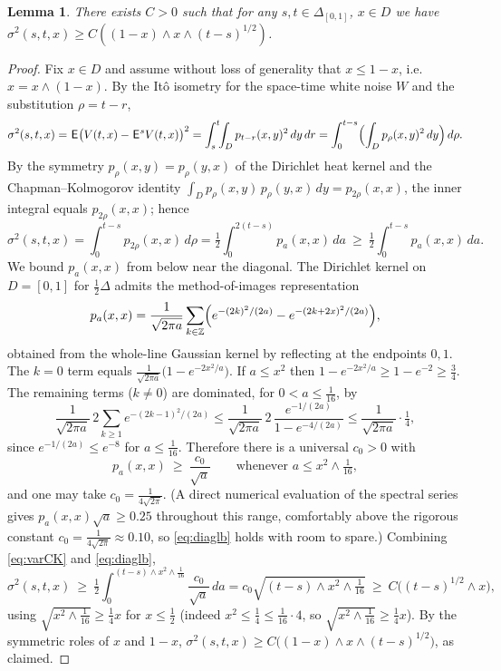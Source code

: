 \documentclass[12pt]{article}
\newtheorem{lemma}[theorem]{Lemma}
\theoremstyle{definition}
\DeclareMathOperator{\1}{\mathbbm{1}}%
\def\E{\hskip.15ex\mathsf{E}\hskip.10ex}
\renewcommand{\ge}{\geqslant}
\renewcommand{\le}{\leqslant}
\newcommand{\Z}{\mathbb{Z}}
\begin{document}
\begin{lemma}\label{L:fkb} There exists $C>0$ such that for any $s,t\in\Delta_{[0,1]}$, $x\in D$ we have 
$\sigma^2(s,t,x)\ge  C ((1-x)\wedge x \wedge (t-s)^{1/2})$.
\end{lemma}


\begin{proof}
Fix $x\in D$ and assume without loss of generality that $x\le 1-x$, i.e. $x=x\wedge(1-x)$.
By the It\^o isometry for the space-time white noise $W$ and the substitution $\rho=t-r$,
\begin{equation}\label{eq:varform}
\sigma^2(s,t,x)=\E\bigl(V(t,x)-\E^sV(t,x)\bigr)^2
=\int_s^t\!\!\int_D p_{t-r}(x,y)^2\,dy\,dr
=\int_0^{t-s}\Bigl(\int_D p_\rho(x,y)^2\,dy\Bigr)\,d\rho .
\end{equation}
By the symmetry $p_\rho(x,y)=p_\rho(y,x)$ of the Dirichlet heat kernel and the
Chapman--Kolmogorov identity $\int_D p_\rho(x,y)\,p_\rho(y,x)\,dy=p_{2\rho}(x,x)$,
the inner integral equals $p_{2\rho}(x,x)$; hence
\begin{equation}\label{eq:varCK}
\sigma^2(s,t,x)=\int_0^{t-s}p_{2\rho}(x,x)\,d\rho
=\tfrac12\int_0^{2(t-s)}p_a(x,x)\,da
\ \ge\ \tfrac12\int_0^{t-s}p_a(x,x)\,da .
\end{equation}
We bound $p_a(x,x)$ from below near the diagonal. The Dirichlet kernel on $D=[0,1]$ for
$\tfrac12\Delta$ admits the method-of-images representation
\[
p_a(x,x)=\frac1{\sqrt{2\pi a}}\sum_{k\in\Z}\Bigl(e^{-(2k)^2/(2a)}-e^{-(2k+2x)^2/(2a)}\Bigr),
\]
obtained from the whole-line Gaussian kernel by reflecting at the endpoints $0,1$. The
$k=0$ term equals $\frac1{\sqrt{2\pi a}}\bigl(1-e^{-2x^2/a}\bigr)$. If $a\le x^2$ then
$1-e^{-2x^2/a}\ge 1-e^{-2}\ge\tfrac34$. The remaining terms ($k\ne0$) are dominated, for
$0<a\le\frac1{16}$, by
\[
\frac1{\sqrt{2\pi a}}\,2\sum_{k\ge1}e^{-(2k-1)^2/(2a)}
\le \frac1{\sqrt{2\pi a}}\,2\,\frac{e^{-1/(2a)}}{1-e^{-4/(2a)}}\le \frac1{\sqrt{2\pi a}}\cdot\tfrac14,
\]
since $e^{-1/(2a)}\le e^{-8}$ for $a\le\frac1{16}$. Therefore there is a universal $c_0>0$ with
\begin{equation}\label{eq:diaglb}
p_a(x,x)\ \ge\ \frac{c_0}{\sqrt a}\qquad\text{whenever } a\le x^2\wedge\tfrac1{16},
\end{equation}
and one may take $c_0=\tfrac{1}{4\sqrt{2\pi}}$. (A direct numerical evaluation of the
spectral series gives $p_a(x,x)\sqrt a\ge 0.25$ throughout this range, comfortably above the
rigorous constant $c_0=\tfrac1{4\sqrt{2\pi}}\approx0.10$, so \eqref{eq:diaglb} holds with room to spare.) Combining \eqref{eq:varCK} and \eqref{eq:diaglb},
\[
\sigma^2(s,t,x)\ \ge\ \tfrac12\int_0^{(t-s)\wedge x^2\wedge\frac1{16}}\frac{c_0}{\sqrt a}\,da
=c_0\sqrt{(t-s)\wedge x^2\wedge\tfrac1{16}}
\ \ge\ C\bigl((t-s)^{1/2}\wedge x\bigr),
\]
using $\sqrt{x^2\wedge\frac1{16}}\ge \tfrac14 x$ for $x\le\tfrac12$ (indeed $x^2\le\frac14\le\frac1{16}\cdot4$,
so $\sqrt{x^2\wedge\frac1{16}}\ge \tfrac14 x$). By the symmetric roles of $x$ and $1-x$,
$\sigma^2(s,t,x)\ge C\bigl((1-x)\wedge x\wedge (t-s)^{1/2}\bigr)$, as claimed.
\end{proof}
\end{document}
